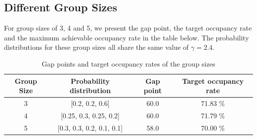 

\subsection*{Different Group Sizes}
For group sizes of 3, 4 and 5, we present the gap point, the target occupancy rate and the maximum achievable occupancy rate in the table below. The probability distributions for these group sizes all share the same value of $\gamma = 2.4$.

\begin{table}[ht]
  \centering
  \caption{Gap points and target occupancy rates of the group sizes}
  \begin{tabular}{|c|c|c|c|}
  \hline
   Group Size & Probability distribution & Gap point & Target occupancy rate \\
  \hline
   3 & [0.2, 0.2, 0.6] & 60.0  & 71.83 \%  \\
   4 & [0.25, 0.3, 0.25, 0.2] & 60.0 & 71.79 \%   \\ 
   5 & [0.3, 0.3, 0.2, 0.1, 0.1] & 58.0 & 70.00 \% \\
   \hline
  \end{tabular}
\end{table}



